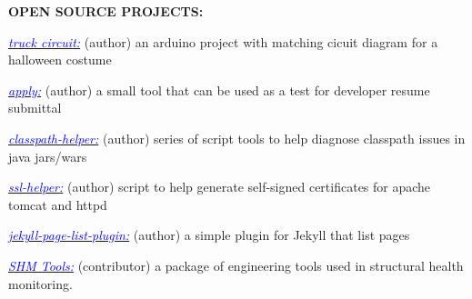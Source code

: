 {\large \textbf{OPEN SOURCE PROJECTS:}}\\
\begin{compactitem}
\item \href{https://github.com/tgsoverly/truck-circuit}{\textcolor{blue}{\textit{truck circuit:}}} (author) an arduino project with matching cicuit diagram for a halloween costume
\item \href{https://github.com/tgsoverly/apply}{\textcolor{blue}{\textit{apply:}}} (author) a small tool that can be used as a test for developer resume submittal
\item \href{https://github.com/spidasoftware/classpath-helper}{\textcolor{blue}{\textit{classpath-helper:}}} (author) series of script tools to help diagnose classpath issues in java jars/wars
\item \href{https://github.com/spidasoftware/ssl-helper}{\textcolor{blue}{\textit{ssl-helper:}}} (author) script to help generate self-signed certificates for apache tomcat and httpd
\item \href{https://github.com/tgsoverly/jekyll-page-list-plugin}{\textcolor{blue}{\textit{jekyll-page-list-plugin:}}} (author) a simple plugin for Jekyll that list pages
\item \href{http://institute.lanl.gov/ei/software-and-data/SHMTools}{\textcolor{blue}{\textit{SHM Tools:}}} (contributor) a package of engineering tools used in structural health monitoring.
\bigskip
\end{compactitem}
